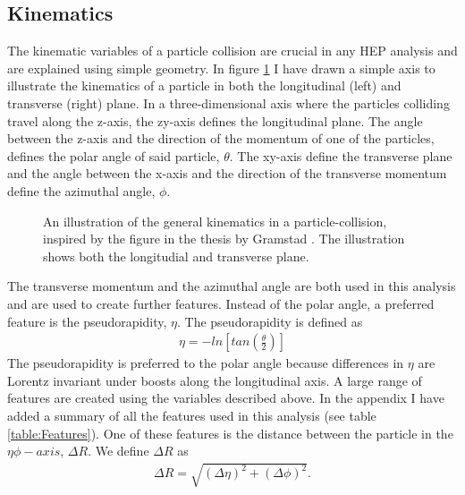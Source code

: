 \subsection{Kinematics}
The kinematic variables of a particle collision are crucial in any \ac{HEP} analysis and are explained using simple 
geometry. In figure \ref{fig:Kinematics} I have drawn a simple axis to illustrate the kinematics of a particle in both the 
longitudinal (left) and transverse (right) plane. In a three-dimensional axis where the particles colliding travel along the 
z-axis, the zy-axis defines the longitudinal plane.  The angle between the z-axis and the direction of the momentum of
one of the particles, defines the polar angle of said particle, $\theta$. The xy-axis define the transverse plane and the 
angle between the x-axis and the direction of the transverse momentum define the azimuthal angle, $\phi$.
\begin{figure}
    \centering
    \caption[An illustration of the general kinematics in a particle-collision.]{An illustration of the general kinematics in a particle-collision, 
    inspired by the figure in the thesis by Gramstad \cite{gramstad_searches_nodate}. The illustration shows both the 
    longitudial and transverse plane. }
    \label{fig:Kinematics}
\end{figure}
The transverse momentum and the azimuthal angle are both used in this analysis and are used to create further features. 
Instead of the polar angle, a preferred feature is the pseudorapidity, $\eta$. The pseudorapidity is defined as 
\begin{align}\label{eq:eta}
    \eta = -ln\left[tan\left(\frac{\theta}{2}\right)\right]
\end{align}
The pseudorapidity is preferred to the polar angle because differences in $\eta$ are Lorentz invariant under boosts 
along the longitudinal axis. A large range of features are created using the variables described above. In the appendix I have 
added a summary of all the features used in this analysis (see table \ref{table:Features}). One of these features is the distance 
between the particle in the $\eta\phi-axis$, $\Delta R$. We define $\Delta R$ as 
\begin{align}
    \Delta R = \sqrt{(\Delta \eta)^2 + (\Delta \phi)^2}.
\end{align}
